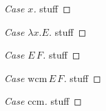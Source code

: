 \documentclass[ms,electronic,twosidetoc,letterpaper,chaptercenter,parttop]{byumsphd}
\begin{document}
\begin{proof}[Case $x$]
stuff
\end{proof}
\begin{proof}[Case $\lambda x.E$]
stuff
\end{proof}
\begin{proof}[Case $E\,F$]
stuff
\end{proof}
\begin{proof}[Case $\mathrm{wcm}\,E\,F$]
stuff
\end{proof}
\begin{proof}[Case $\mathrm{ccm}$]
stuff
\end{proof}


  


  




\end{document}

